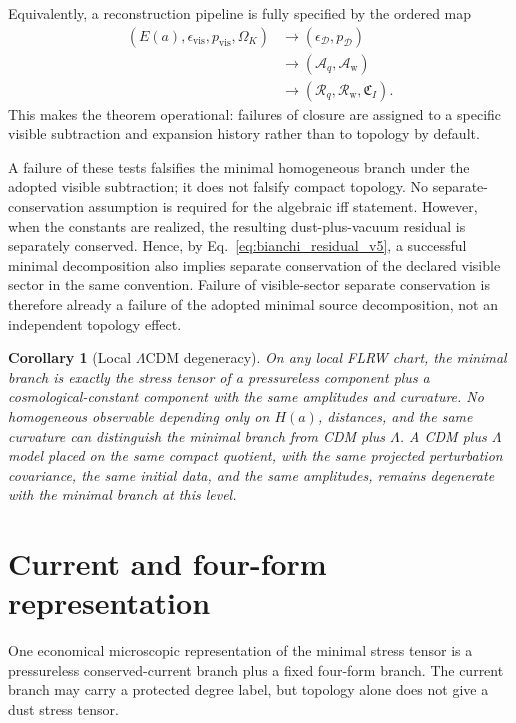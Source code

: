 \documentclass[
  aps,
  prd,
  reprint,
  superscriptaddress,
  floatfix,
  nofootinbib,
  longbibliography
]{revtex4-2}
\theoremstyle{plain}
\newtheorem{corollary}[theorem]{Corollary}
\theoremstyle{definition}
\theoremstyle{remark}
\newcommand{\D}{\mathcal D}
\newcommand{\vis}{\mathrm{vis}}
\newcommand{\wind}{\mathrm w}
\newcommand{\Ok}{\Omega_K}
\newcommand{\Aq}{\mathcal A_q}
\newcommand{\Aw}{\mathcal A_{\mathrm w}}
\newcommand{\Rcl}{\mathcal R}
\newcommand{\eps}{\epsilon}
\newcommand{\LCDM}{\Lambda\mathrm{CDM}}
\begin{document}
Equivalently, a reconstruction pipeline is fully specified by the ordered map
\begin{equation}
\begin{aligned}
(E(a),\eps_{\vis},p_{\vis},\Ok)
&\longrightarrow (\eps_\D,p_\D)\\
&\longrightarrow (\Aq,\Aw)\\
&\longrightarrow (\Rcl_q,\Rcl_{\wind},\mathfrak C_I).
\end{aligned}
\label{eq:closure_pipeline_v26}
\end{equation}
This makes the theorem operational: failures of closure are assigned to a
specific visible subtraction and expansion history rather than to topology by
default.

A failure of these tests falsifies the minimal homogeneous branch under the
adopted visible subtraction; it does not falsify compact topology.  No separate-conservation assumption is required for the algebraic iff statement.
However, when the constants are realized, the resulting dust-plus-vacuum residual
is separately conserved.  Hence, by Eq.~\eqref{eq:bianchi_residual_v5}, a
successful minimal decomposition also implies separate conservation of the
declared visible sector in the same convention.  Failure of visible-sector
separate conservation is therefore already a failure of the adopted minimal
source decomposition, not an independent topology effect.

\begin{corollary}[Local \(\LCDM\) degeneracy]
On any local FLRW chart, the minimal branch is exactly the stress tensor of a
pressureless component plus a cosmological-constant component with the same
amplitudes and curvature.  No homogeneous observable depending only on
\(H(a)\), distances, and the same curvature can distinguish the minimal branch
from CDM plus \(\Lambda\).  A CDM plus \(\Lambda\) model placed on the same
compact quotient, with the same projected perturbation covariance, the same
initial data, and the same amplitudes, remains degenerate with the minimal
branch at this level.
\end{corollary}

\section{Current and four-form representation}

One economical microscopic representation of the minimal stress tensor is a
pressureless conserved-current branch plus a fixed four-form branch.  The current branch may carry a protected
degree label, but topology alone does not give a dust stress tensor.
\end{document}

